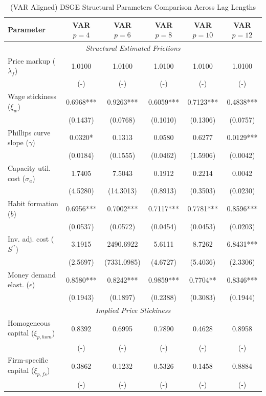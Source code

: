 \begin{table}[htpb]
    \centering
    \small
    \renewcommand{\arraystretch}{1.2}
    \caption{(VAR Aligned) DSGE Structural Parameters Comparison Across Lag Lengths}
    \label{tab:dsge_params_comparison}
    \begin{tabular}{lccccc}
    \toprule
    \textbf{Parameter} & \textbf{VAR $p=4$} & \textbf{VAR $p=6$} & \textbf{VAR $p=8$} & \textbf{VAR $p=10$} & \textbf{VAR $p=12$} \\
    \midrule \multicolumn{6}{c}{\textit{Structural Estimated Frictions}} \\
    Price markup ($\lambda_f$) & 1.0100 & 1.0100 & 1.0100 & 1.0100 & 1.0100 \\
    & (-) & (-) & (-) & (-) & (-) \\
    Wage stickiness ($\xi_w$) & 0.6968*** & 0.9263*** & 0.6059*** & 0.7123*** & 0.4838*** \\
    & (0.1437) & (0.0768) & (0.1010) & (0.1306) & (0.0757) \\
    Phillips curve slope ($\gamma$) & 0.0320* & 0.1313 & 0.0580 & 0.6277 & 0.0129*** \\
    & (0.0184) & (0.1555) & (0.0462) & (1.5906) & (0.0042) \\
    Capacity util. cost ($\sigma_a$) & 1.7405 & 7.5043 & 0.1912 & 0.2214 & 0.0042 \\
    & (4.5280) & (14.3013) & (0.8913) & (0.3503) & (0.0230) \\
    Habit formation ($b$) & 0.6956*** & 0.7002*** & 0.7117*** & 0.7781*** & 0.8596*** \\
    & (0.0537) & (0.0572) & (0.0454) & (0.0453) & (0.0203) \\
    Inv. adj. cost ($S^{\prime\prime}$) & 3.1915 & 2490.6922 & 5.6111 & 8.7262 & 6.8431*** \\
    & (2.5697) & (7331.0985) & (4.6727) & (5.4036) & (2.3306) \\
    Money demand elast. ($\epsilon$) & 0.8580*** & 0.8242*** & 0.9859*** & 0.7704** & 0.8346*** \\
    & (0.1943) & (0.1897) & (0.2388) & (0.3083) & (0.1944) \\
    \midrule \multicolumn{6}{c}{\textit{Implied Price Stickiness}} \\
    Homogeneous capital ($\xi_{p, hom}$) & 0.8392 & 0.6995 & 0.7890 & 0.4628 & 0.8958 \\
    & (-) & (-) & (-) & (-) & (-) \\
    Firm-specific capital ($\xi_{p, fs}$) & 0.3862 & 0.1232 & 0.5326 & 0.1458 & 0.8884 \\
    & (-) & (-) & (-) & (-) & (-) \\
    \bottomrule
    \end{tabular}
\end{table}
